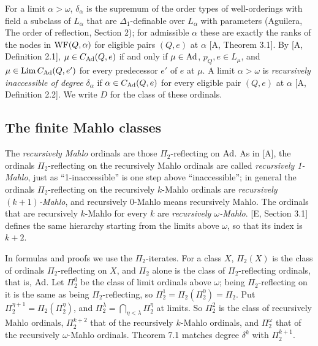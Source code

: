 \documentclass[11pt]{article}
\begin{document}
For a limit $\alpha > \omega$, $\delta_\alpha$ is the supremum of the order types of well-orderings with field a
subclass of $L_\alpha$ that are $\Delta_1$-definable over $L_\alpha$ with parameters (Aguilera, The order of
reflection, Section 2); for admissible $\alpha$ these are exactly the ranks of the nodes in $\mathrm{WF}(Q,\alpha)$ for
eligible pairs $(Q, e)$ at $\alpha$ [A, Theorem 3.1]. By [A, Definition 2.1], $\mu \in C_{\mathrm{Ad}}(Q, e)$ if and only if $\mu
\in \mathrm{Ad}$, $p_Q, e \in L_\mu$, and $\mu \in \mathrm{Lim}\, C_{\mathrm{Ad}}(Q, e')$ for every predecessor $e'$ of $e$ at $\mu$. A limit $\alpha
> \omega$ is \emph{recursively inaccessible of degree $\delta_\alpha$} if $\alpha \in C_{\mathrm{Ad}}(Q, e)$ for every eligible pair
$(Q,e)$ at $\alpha$ [A, Definition 2.2]. We write $D$ for the class of these ordinals.

\subsection{The finite Mahlo classes}

The \emph{recursively Mahlo} ordinals are those $\Pi_2$-reflecting on $\mathrm{Ad}$. As in [A], the ordinals
$\Pi_2$-reflecting on the recursively Mahlo ordinals are called \emph{recursively 1-Mahlo}, just as ``1-inaccessible''
is one step above ``inaccessible''; in general the ordinals $\Pi_2$-reflecting on the recursively $k$-Mahlo ordinals
are \emph{recursively $(k+1)$-Mahlo}, and recursively 0-Mahlo means recursively Mahlo. The ordinals that are
recursively $k$-Mahlo for every $k$ are \emph{recursively $\omega$-Mahlo}. [E, Section 3.1] defines the same hierarchy
starting from the limits above $\omega$, so that its index is $k+2$.

In formulas and proofs we use the $\Pi_2$-iterates. For a class $X$, $\Pi_2(X)$ is the class of ordinals
$\Pi_2$-reflecting on $X$, and $\Pi_2$ alone is the class of $\Pi_2$-reflecting ordinals, that is, $\mathrm{Ad}$. Let
$\Pi_2^0$ be the class of limit ordinals above $\omega$; being $\Pi_2$-reflecting on it is the same as being
$\Pi_2$-reflecting, so $\Pi_2^1 = \Pi_2(\Pi_2^0) = \Pi_2$. Put $\Pi_2^{\eta+1} = \Pi_2(\Pi_2^\eta)$, and $\Pi_2^\lambda = \bigcap_{\eta<\lambda} \Pi_2^\eta$ at
limits. So $\Pi_2^2$ is the class of recursively Mahlo ordinals, $\Pi_2^{k+2}$ that of the recursively $k$-Mahlo
ordinals, and $\Pi_2^\omega$ that of the recursively $\omega$-Mahlo ordinals. Theorem 7.1 matches degree $\delta^k$
with $\Pi_2^{k+1}$.
\end{document}
